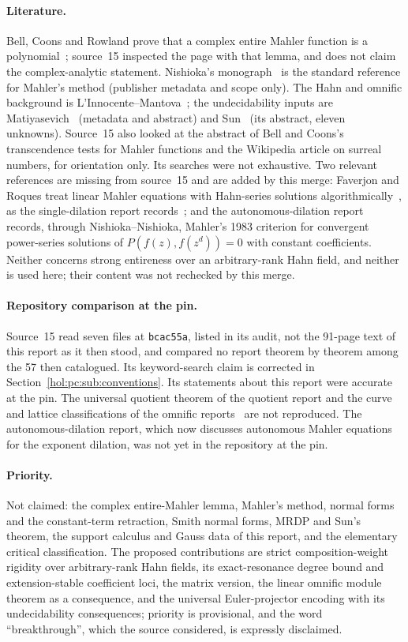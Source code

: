 \documentclass[11pt]{article}
\numberwithin{equation}{section}
\theoremstyle{definition}
\theoremstyle{remark}
\begin{document}
\paragraph{Literature.}
Bell, Coons and Rowland prove that a complex entire Mahler function is a
polynomial~\cite[Lemma~6]{bcr}; source~15 inspected the page with that lemma,
and does not claim the complex-analytic statement. Nishioka's
monograph~\cite{nishioka} is the standard reference for Mahler's method
(publisher metadata and scope only). The Hahn and omnific background is
L'Innocente--Mantova~\cite{lmfactor}; the undecidability inputs are
Matiyasevich~\cite{matiyasevich} (metadata and abstract) and Sun~\cite{sun}
(its abstract, eleven unknowns). Source~15 also looked at the abstract of Bell
and Coons's transcendence tests for Mahler functions and the Wikipedia
article on surreal numbers, for orientation only. Its searches were not
exhaustive. Two relevant references are missing from source~15 and are added
by this merge: Faverjon and Roques treat linear Mahler equations with
Hahn-series solutions algorithmically~\cite{faverjonroques}, as the
single-dilation report records~\cite{reposdhs}; and the autonomous-dilation
report~\cite{repoadr} records, through Nishioka--Nishioka, Mahler's 1983
criterion for convergent power-series solutions of $P(f(z),f(z^d))=0$ with
constant coefficients. Neither concerns strong entireness over an
arbitrary-rank Hahn field, and neither is used here; their content was not
rechecked by this merge.

\paragraph{Repository comparison at the pin.}
Source~15 read seven files at \texttt{bcac55a}, listed in its audit, not the
91-page text of this report as it then stood, and compared no report theorem by
theorem among the 57 then catalogued. Its keyword-search claim is corrected in
Section~\ref{hol:pc:sub:conventions}. Its statements about this report were
accurate at the pin. The universal quotient theorem of the quotient report and
the curve and lattice classifications of the omnific
reports~\cite{repoosq,repoodg} are not reproduced. The autonomous-dilation
report, which now discusses autonomous Mahler equations for the exponent
dilation, was not yet in the repository at the pin.

\paragraph{Priority.}
Not claimed: the complex entire-Mahler lemma, Mahler's method, normal forms and
the constant-term retraction, Smith normal forms, MRDP and Sun's theorem, the
support calculus and Gauss data of this report, and the elementary critical
classification. The proposed contributions are strict composition-weight
rigidity over arbitrary-rank Hahn fields, its exact-resonance degree bound and
extension-stable coefficient loci, the matrix version, the linear omnific
module theorem as a consequence, and the universal Euler-projector encoding
with its undecidability consequences; priority is provisional, and the word
``breakthrough'', which the source considered, is expressly disclaimed.
\end{document}
